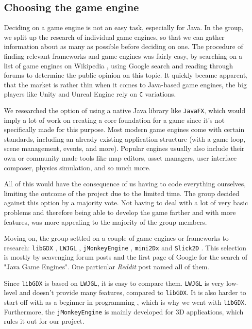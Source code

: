 \documentclass[12p]{article}
\begin{document}

\subsection{Choosing the game engine} \label{DocGameEngine}

Deciding on a game engine is not an easy task, especially for Java. In the group, we split up the research of individual game engines, so that we can gather information about as many as possible before deciding on one. The procedure of finding relevant frameworks and game engines was fairly easy, by searching on a list of game engines on Wikipedia \cite{ListOfGameEngines}, using Google search and reading through forums to determine the public opinion on this topic. It quickly became apparent, that the market is rather thin when it comes to Java-based game engines, the big players like Unity \cite{UnityGameEngine} and Unreal Engine \cite{UnrealEngine} rely on \texttt{C} variations.

We researched the option of using a native Java library like \texttt{JavaFX}, which would imply a lot of work on creating a core foundation for a game since it's not specifically made for this purpose. Most modern game engines come with certain standards, including an already existing application structure (with a game loop, scene management, events, and more). Popular engines usually also include their own or community made tools like map editors, asset managers, user interface composer, physics simulation, and so much more.

All of this would have the consequence of us having to code everything ourselves, limiting the outcome of the project due to the limited time. The group decided against this option by a majority vote. Not having to deal with a lot of very basic problems and therefore being able to develop the game farther and with more features, was more appealing to the majority of the group members.

Moving on, the group settled on a couple of game engines or frameworks to research: \texttt{libGDX} \cite{LibGDX}, \texttt{LWJGL} \cite{LWJGL}, \texttt{jMonkeyEngine} \cite{jMonkeyEngine}, \texttt{mini2Dx} \cite{mini2Dx} and \texttt{Slick2D} \cite{Slick2D}. This selection is mostly by scavenging forum posts and the first page of Google for the search of "Java Game Engines". One particular \emph{Reddit} post \cite{RedditJavaGameEngines} named all of them.

Since \texttt{libGDX} is based on \texttt{LWJGL}, it is easy to compare them. \texttt{LWJGL} is very low-level and doesn't provide many features, compared to \texttt{libGDX}. It is also harder to start off with as a beginner in programming \cite{StackExchangeLibGDXLWJGL}, which is why we went with \texttt{libGDX}. Furthermore, the \texttt{jMonkeyEngine} is mainly developed for 3D applications, which rules it out for our project. 
\end{document}

